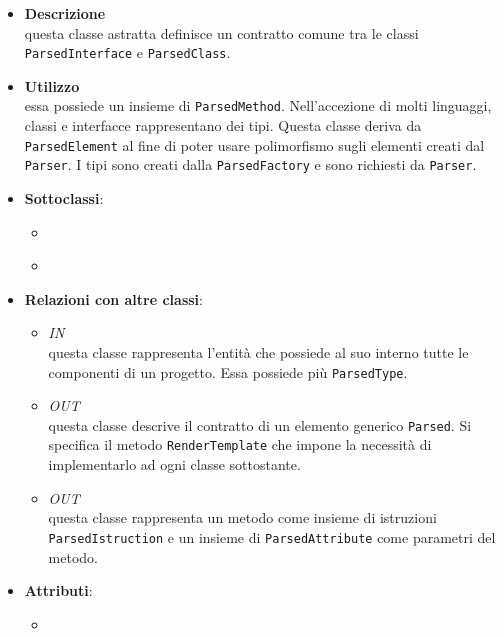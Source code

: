 \begin{itemize}
\item \textbf{Descrizione}\\
questa classe astratta definisce un contratto comune tra le classi \texttt{ParsedInterface} e \texttt{ParsedClass}. 
\item \textbf{Utilizzo}\\
essa possiede un insieme di \texttt{ParsedMethod}. Nell'accezione di molti linguaggi, classi e interfacce rappresentano dei tipi. Questa classe deriva da \texttt{ParsedElement} al fine di poter usare polimorfismo sugli elementi creati dal \texttt{Parser}. 
I tipi sono creati dalla \texttt{ParsedFactory} e sono richiesti da \texttt{Parser}.
\item \textbf{Sottoclassi}:
\begin{itemize}
\item \hyperref[\nogloxy{swedesigner::server::project::ParsedClass}]{}
\item \hyperref[\nogloxy{swedesigner::server::project::ParsedInterface}]{}
\end{itemize}
\item \textbf{Relazioni con altre classi}:
\begin{itemize}
\item \textit{IN} \hyperref[\nogloxy{swedesigner::server::project::ParsedProgram}]{}\\
questa classe rappresenta l'entità che possiede al suo interno tutte le componenti di un progetto. Essa possiede più \texttt{ParsedType}.
\item \textit{OUT} \hyperref[\nogloxy{swedesigner::server::project::ParsedElement}]{}\\
questa classe descrive il contratto di un elemento generico \texttt{Parsed}. Si specifica il metodo \texttt{RenderTemplate} che impone la necessità di implementarlo ad ogni classe sottostante.
\item \textit{OUT} \hyperref[\nogloxy{swedesigner::server::project::ParsedMethod}]{}\\
questa classe rappresenta un metodo come insieme di istruzioni \texttt{ParsedIstruction} e un insieme di \texttt{ParsedAttribute} come parametri del metodo.
\end{itemize}
\item \textbf{Attributi}:
\begin{itemize}
\item {}

\end{itemize}
\end{itemize}
